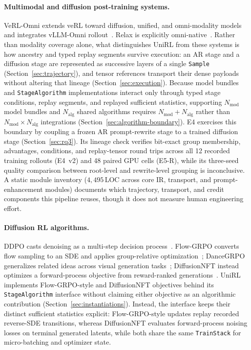 \documentclass[10pt]{article}
\newcommand{\sample}{\texttt{Sample}}
\begin{document}
\paragraph{Multimodal and diffusion post-training systems.}
VeRL-Omni extends veRL toward diffusion, unified, and omni-modality models and integrates vLLM-Omni rollout~\citep{verlomni2026}.
Relax is explicitly omni-native~\citep{zhang2026relax}.
Rather than modality coverage alone, what distinguishes UniRL from these systems is how ancestry and typed replay segments survive execution: an AR stage and a diffusion stage are represented as successive layers of a single \sample{} (Section~\ref{sec:trajectory}), and tensor references transport their dense payloads without altering that lineage (Section~\ref{sec:execution}).
Because model bundles and \texttt{StageAlgorithm} implementations interact only through typed stage conditions, replay segments, and replayed sufficient statistics, supporting $N_{\mathrm{mod}}$ model bundles and $N_{\mathrm{alg}}$ shared algorithms requires $N_{\mathrm{mod}}+N_{\mathrm{alg}}$ rather than $N_{\mathrm{mod}}\times N_{\mathrm{alg}}$ integrations (Section~\ref{sec:algorithm-boundary}).
E4 exercises this boundary by coupling a frozen AR prompt-rewrite stage to a trained diffusion stage (Section~\ref{sec:rq3}).
Its lineage check verifies bit-exact group membership, advantages, conditions, and replay-tensor round trips across all 12 recorded training rollouts (E4~v2) and 48 paired GPU cells (E5-R), while its three-seed quality comparison between root-level and rewrite-level grouping is inconclusive.
A static module inventory ($4{,}495$\,LOC across core IR, transport, and prompt-enhancement modules) documents which trajectory, transport, and credit components this pipeline reuses, though it does not measure human engineering effort.

\paragraph{Diffusion RL algorithms.}
DDPO casts denoising as a multi-step decision process~\citep{black2023ddpo}.
Flow-GRPO converts flow sampling to an SDE and applies group-relative optimization~\citep{liu2025flowgrpo}; DanceGRPO generalizes related ideas across visual generation tasks~\citep{xue2025dancegrpo}; DiffusionNFT instead optimizes a forward-process objective from reward-ranked generations~\citep{zheng2025diffusionnft}.
UniRL implements Flow-GRPO-style and DiffusionNFT objectives behind its \texttt{StageAlgorithm} interface without claiming either objective as an algorithmic contribution (Section~\ref{sec:instantiations}).
Instead, the interface keeps their distinct sufficient statistics explicit: Flow-GRPO-style updates replay recorded reverse-SDE transitions, whereas DiffusionNFT evaluates forward-process noising losses on terminal generated latents, while both share the same \texttt{TrainStack} for micro-batching and optimizer state.
\end{document}
